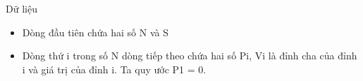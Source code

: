Dữ liệu  
\begin{itemize}
	\item     Dòng đầu tiên chứa hai số N và S   
	\item     Dòng thứ i trong số N dòng tiếp theo chứa hai số Pi, Vi là đỉnh cha của đỉnh i và giá trị của đỉnh i. Ta quy ước P1 = 0.   
\end{itemize}
